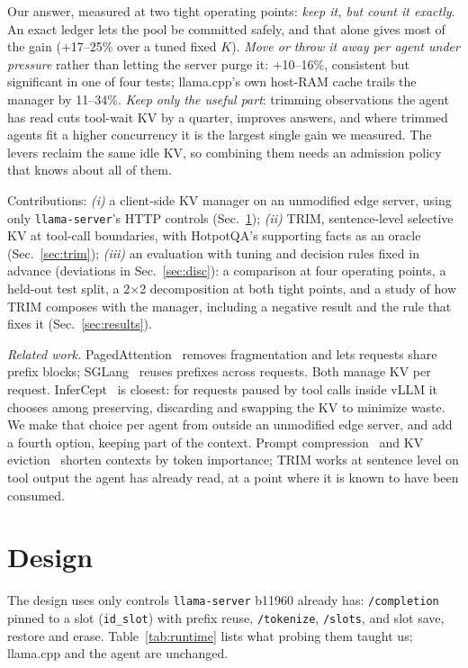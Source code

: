 \documentclass[conference]{IEEEtran}
\newcommand{\K}{$K$}
\newcommand{\x}{$\times$}
\begin{document}
Our answer, measured at two tight operating points: \emph{keep it, but count it exactly}. An exact
ledger lets the pool be committed safely, and that alone gives most of the gain (+17--25\% over a
tuned fixed \K). \emph{Move or throw it away per agent under pressure} rather than letting the server
purge it: +10--16\%, consistent but significant in one of four tests; llama.cpp's own host-RAM cache
trails the manager by 11--34\%. \emph{Keep only the useful part}: trimming observations the agent has
read cuts tool-wait KV by a quarter, improves answers, and where trimmed agents fit a higher
concurrency it is the largest single gain we measured. The levers reclaim the same idle KV, so
combining them needs an admission policy that knows about all of them.

Contributions: \emph{(i)} a client-side KV manager on an unmodified edge server, using only
\texttt{llama-server}'s HTTP controls (Sec.~\ref{sec:design}); \emph{(ii)} TRIM, sentence-level
selective KV at tool-call boundaries, with HotpotQA's supporting facts as an oracle
(Sec.~\ref{sec:trim}); \emph{(iii)} an evaluation with tuning and decision rules fixed in advance
(deviations in Sec.~\ref{sec:disc}): a comparison at four operating points, a held-out test split, a
2\x2 decomposition at both tight points, and a study of how TRIM composes with the manager, including a
negative result and the rule that fixes it (Sec.~\ref{sec:results}).

\emph{Related work.} PagedAttention~\cite{vllm} removes fragmentation and lets requests share prefix
blocks; SGLang~\cite{sglang} reuses prefixes across requests. Both manage KV per request.
InferCept~\cite{infercept} is closest: for requests paused by tool calls inside vLLM it chooses
among preserving, discarding and swapping the KV to minimize waste. We make that choice per agent
from outside an unmodified edge server, and add a fourth option, keeping part of the context. Prompt
compression~\cite{llmlingua} and KV eviction~\cite{h2o} shorten contexts by token importance; TRIM
works at sentence level on tool output the agent has already read, at a point where it is known to
have been consumed.

\section{Design}\label{sec:design}

The design uses only controls \texttt{llama-server} b11960 already has: \texttt{/completion} pinned
to a slot (\texttt{id\_slot}) with prefix reuse, \texttt{/tokenize}, \texttt{/slots}, and slot save,
restore and erase. Table~\ref{tab:runtime} lists what probing them taught us; llama.cpp and the agent
are unchanged.
\end{document}
